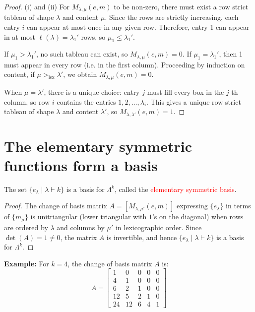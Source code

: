 \documentclass[12pt]{memoir}
\begin{document}
\begin{proof}
(i) and (ii) For $M_{\lambda,\mu}(e,m)$ to be non-zero, there must exist a row strict tableau of shape $\lambda$ and content $\mu$. Since the rows are strictly increasing, each entry $i$ can appear at most once in any given row. Therefore, entry 1 can appear in at most $\ell(\lambda) = \lambda_1'$ rows, so $\mu_1 \le \lambda_1'$.

If $\mu_1 > \lambda_1'$, no such tableau can exist, so $M_{\lambda,\mu}(e,m) = 0$. If $\mu_1 = \lambda_1'$, then 1 must appear in every row (i.e. in the first column). Proceeding by induction on content, if $\mu >_{\text{lex}} \lambda'$, we obtain $M_{\lambda,\mu}(e,m) = 0$.

When $\mu = \lambda'$, there is a unique choice: entry $j$ must fill every box in the $j$-th column, so row $i$ contains the entries $1, 2, \dots, \lambda_i$. This gives a unique row strict tableau of shape $\lambda$ and content $\lambda'$, so $M_{\lambda,\lambda'}(e,m) = 1$.
\end{proof}

\newpage

\section{The elementary symmetric functions form a basis}

\begin{ptcb}
\begin{Prop}
The set $\{e_\lambda \mid \lambda \vdash k\}$ is a basis for $\Lambda^k$, called the \textcolor{red}{elementary symmetric basis}.
\end{Prop}
\end{ptcb}

\begin{proof}
The change of basis matrix $A = [M_{\lambda,\mu'}(e,m)]$ expressing $\{e_\lambda\}$ in terms of $\{m_\mu\}$ is unitriangular (lower triangular with $1$'s on the diagonal) when rows are ordered by $\lambda$ and columns by $\mu'$ in lexicographic order. Since $\det(A) = 1 \neq 0$, the matrix $A$ is invertible, and hence $\{e_\lambda \mid \lambda \vdash k\}$ is a basis for $\Lambda^k$.
\end{proof}

\textbf{Example:} For $k = 4$, the change of basis matrix $A$ is:
\[
A = \begin{bmatrix}
1 & 0 & 0 & 0 & 0 \\
4 & 1 & 0 & 0 & 0 \\
6 & 2 & 1 & 0 & 0 \\
12 & 5 & 2 & 1 & 0 \\
24 & 12 & 6 & 4 & 1
\end{bmatrix}
\]
\end{document}
